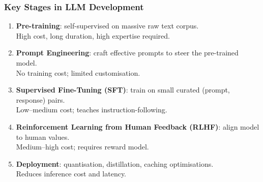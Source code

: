 \begin{frame}[fragile]\frametitle{Key Stages in LLM Development}
\begin{enumerate}
\item \textbf{Pre-training}: self-supervised on massive raw text corpus.\\
  {\small High cost, long duration, high expertise required.}
\item \textbf{Prompt Engineering}: craft effective prompts to steer the pre-trained model.\\
  {\small No training cost; limited customisation.}
\item \textbf{Supervised Fine-Tuning (SFT)}: train on small curated (prompt, response) pairs.\\
  {\small Low–medium cost; teaches instruction-following.}
\item \textbf{Reinforcement Learning from Human Feedback (RLHF)}: align model to human values.\\
  {\small Medium–high cost; requires reward model.}
\item \textbf{Deployment}: quantisation, distillation, caching optimisations.\\
  {\small Reduces inference cost and latency.}
\end{enumerate}
\end{frame}


